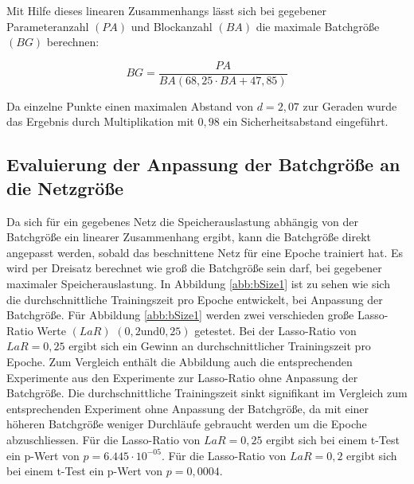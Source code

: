 Mit Hilfe dieses linearen Zusammenhangs lässt sich bei gegebener Parameteranzahl $(PA)$ und Blockanzahl $(BA)$ die maximale Batchgröße $(BG)$ berechnen:

\begin{equation}
 BG=\frac{PA}{BA\left( 68,25 \cdot BA + 47,85\right)}
\end{equation}


Da einzelne Punkte einen maximalen Abstand von $d=2,07$ zur Geraden wurde das Ergebnis durch Multiplikation mit $0,98$ ein Sicherheitsabstand eingeführt.


\subsection{Evaluierung der Anpassung der Batchgröße an die Netzgröße}

Da sich für ein gegebenes Netz die Speicherauslastung abhängig von der Batchgröße ein linearer Zusammenhang ergibt, kann die Batchgröße direkt angepasst werden, sobald das beschnittene Netz für eine Epoche trainiert hat. Es wird per Dreisatz berechnet wie groß die Batchgröße sein darf, bei gegebener maximaler Speicherauslastung. In Abbildung \ref{abb:bSize1} ist zu sehen wie sich die durchschnittliche Trainingszeit pro Epoche entwickelt, bei Anpassung der Batchgröße. Für Abbildung \ref{abb:bSize1} werden zwei verschieden große Lasso-Ratio Werte $(LaR)$ $(0,2 \text{und} 0,25)$ getestet. Bei der Lasso-Ratio von $LaR=0,25$ ergibt sich ein Gewinn an durchschnittlicher Trainingszeit pro Epoche. Zum Vergleich enthält die Abbildung auch die entsprechenden Experimente aus den Experimente zur Lasso-Ratio ohne Anpassung der Batchgröße. Die durchschnittliche Trainingszeit sinkt signifikant im Vergleich zum entsprechenden Experiment ohne Anpassung der Batchgröße, da mit einer höheren Batchgröße weniger Durchläufe gebraucht werden um die Epoche abzuschliessen. Für die Lasso-Ratio von $LaR=0,25$ ergibt sich bei einem t-Test ein p-Wert von $p=6.445\cdot 10^{-05}$. Für die Lasso-Ratio von $LaR=0,2$ ergibt sich bei einem t-Test ein p-Wert von $p=0,0004$. 




